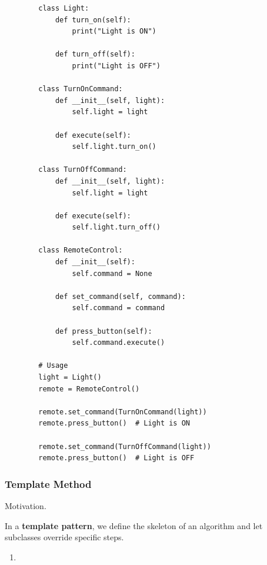     \begin{example}
      \label{ex:remote-control}
      \begin{lstlisting}
        class Light:
            def turn_on(self):
                print("Light is ON")
            
            def turn_off(self):
                print("Light is OFF")

        class TurnOnCommand:
            def __init__(self, light):
                self.light = light
            
            def execute(self):
                self.light.turn_on()

        class TurnOffCommand:
            def __init__(self, light):
                self.light = light
            
            def execute(self):
                self.light.turn_off()

        class RemoteControl:
            def __init__(self):
                self.command = None
            
            def set_command(self, command):
                self.command = command
            
            def press_button(self):
                self.command.execute()

        # Usage
        light = Light()
        remote = RemoteControl()

        remote.set_command(TurnOnCommand(light))
        remote.press_button()  # Light is ON

        remote.set_command(TurnOffCommand(light))
        remote.press_button()  # Light is OFF 
      \end{lstlisting}
    \end{example}

  \subsubsection{Template Method}

    Motivation. 

    \begin{definition}
      \label{def:template-pattern}
      In a \textbf{template pattern}, we define the skeleton of an algorithm and let subclasses override specific steps. 
      \begin{enumerate}
        \item 
      \end{enumerate}
    \end{definition}

